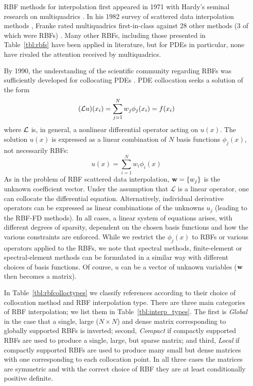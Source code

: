 \documentclass{report}
\begin{document}
{RBF methods for interpolation first appeared in 1971 with Hardy's seminal research on multiquadrics
\cite{Hardy1971}. In his 1982 survey of scattered data interpolation methods \cite{Franke1982}, Franke rated multiquadrics first-in-class against 28 other methods (3 of which were RBFs) \cite{Franke1982}. Many other RBFs, 
including those presented in Table~\ref{tbl:rbfs} have been applied in literature, but for PDEs in particular, none have rivaled the 
attention received by multiquadrics. 


By 1990, the understanding of the scientific community regarding RBFs was sufficiently developed for collocating PDEs \cite{Kansa1990a,Kansa1990b}. PDE collocation seeks a solution of the form
\begin{eqnarray*}
(\mathcal{L}u)(x_i) = \sum_{j=1}^{N} w_j \phi_j(x_i) = f(x_i)
\end{eqnarray*}
where $\mathcal{L}$ is, in general, a nonlinear differential operator acting on $u(x)$. The solution $u(x)$ is expressed as a linear combination of $N$ basis functions $\phi_j(x)$, not necessarily RBFs: 
$$
u(x) = \sum_{i=1}^N w_i \phi_i(x)
$$
As in the problem of RBF scattered data interpolation, $ \mathbf{w} = \{w_j\} $ is the unknown coefficient vector. 
Under the assumption that $\mathcal{L}$ is a linear operator, one can collocate the differential equation. Alternatively, individual derivative operators can be expressed as linear combinations of the unknowns $u_j$ (leading to the RBF-FD methods). 
In all cases, a linear system of equations arises, with different degrees of sparsity, dependent on the chosen basis functions and how the various constraints are enforced.  While we restrict the $\phi_j(x)$ to RBFs or various operators applied to the RBFs, we note that spectral methods, finite-element or spectral-element methods can be formulated in a similar way with different choices of basis functions.  Of course, $u$ can be a vector of unknown variables ($\mathbf{w}$ then becomes a matrix). %


In Table~\ref{tbl:rbfcolloctypes} we classify references according to their choice of collocation method and RBF 
interpolation type. 
There are three main categories of RBF interpolation; we list them in Table~\ref{tbl:interp_types}. The first is \emph{Global} in the case that a single, large ($N\times N$) and 
dense matrix corresponding to globally supported RBFs is inverted; second, \emph{Compact} if compactly supported RBFs are used to 
produce a single, large, but sparse matrix; and third, \emph{Local} if compactly supported RBFs are used to produce many small but 
dense matrices with one corresponding to each collocation point. In all three cases the matrices are symmetric and with the correct choice of RBF they are at least conditionally positive definite. 

}
\end{document}
